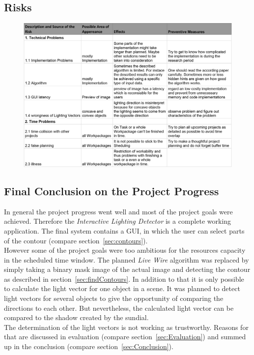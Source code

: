 \subsection{Risks} \label{sec:risks}
\begin{figure}[H] 
	\center 
	\includegraphics[scale = 0.7]{Images/risks.jpg}			
\end{figure}

\subsection{Final Conclusion on the Project Progress} \label{sec:pmCon}
In general the project progress went well and most of the project goals were achieved. Therefore the \textit{Interactive Lighting Detector} is a complete working application. The final system contains a GUI, in which the user can select parts of the contour (compare section~\ref{sec:contours}). \\
However some of the project goals were too ambitious for the resources capacity in the scheduled time window. The planned \textit{Live Wire} algorithm was replaced by simply taking a binary mask image of the actual image and detecting the contour as described in section~\ref{sec:findContours}. In addition to that it is only possible to calculate the light vector for one object in a scene. It was planned to detect light vectors for several objects to give the opportunity of comparing the directions to each other. But nevertheless, the calculated light vector can be compared to the shadow created by the sundial. \\
The determination of the light vectors is not working as trustworthy. Reasons for that are discussed in evaluation (compare section~\ref{sec:Evaluation}) and summed up in the conclusion (compare section~\ref{sec:Conclusion}).



\newpage

























